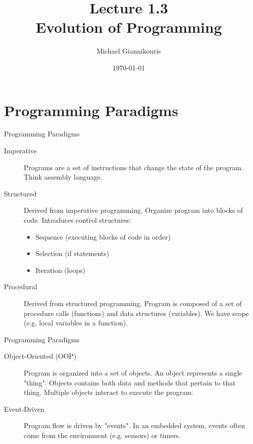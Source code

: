 \documentclass{beamer}
\title{Lecture 1.3 \\ Evolution of Programming}
\date{\today}
\author{Michael Giannikouris}
\institute{Department of Electrical and Computer Engineering}
\begin{document}
\maketitle

\section{Programming Paradigms}
  
\begin{frame}{Programming Paradigms}
	\begin{description}
		\item[Imperative]		
		Programs are a set of instructions that change the state of the program. Think assembly language.
		
		\item[Structured]
		Derived from imperative programming. Organize program into blocks of code. Introduces control structures:
		
		\begin{itemize}
			\item Sequence	(executing blocks of code in order)
			\item Selection (if statements)
			\item Iteration (loops)
		\end{itemize}
		
		\item[Procedural]
		Derived from structured programming. Program is composed of a set of procedure calls (functions) and data structures (variables). We have scope (e.g. local variables in a function).

	\end{description}
\end{frame}  
  
\begin{frame}{Programming Paradigms}

	\begin{description}
		\item[Object-Oriented (OOP)]
		Program is organized into a set of objects. An object represents a single "thing". Objects contains both data and methods that pertain to that thing. Multiple objects interact to execute the program.
		
		\item[Event-Driven]
		Program flow is driven by "events". In an embedded system, events often come from the environment (e.g. sensors) or timers.
	\end{description}
\end{frame}  
\end{document}
